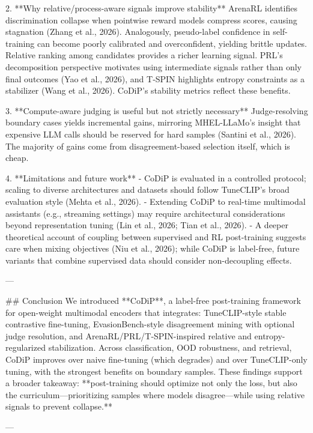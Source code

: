 2. **Why relative/process-aware signals improve stability**  
ArenaRL identifies discrimination collapse when pointwise reward models compress scores, causing stagnation (Zhang et al., 2026). Analogously, pseudo-label confidence in self-training can become poorly calibrated and overconfident, yielding brittle updates. Relative ranking among candidates provides a richer learning signal. PRL’s decomposition perspective motivates using intermediate signals rather than only final outcomes (Yao et al., 2026), and T‑SPIN highlights entropy constraints as a stabilizer (Wang et al., 2026). CoDiP’s stability metrics reflect these benefits.

3. **Compute-aware judging is useful but not strictly necessary**  
Judge-resolving boundary cases yields incremental gains, mirroring MHEL-LLaMo’s insight that expensive LLM calls should be reserved for hard samples (Santini et al., 2026). The majority of gains come from disagreement-based selection itself, which is cheap.

4. **Limitations and future work**  
- CoDiP is evaluated in a controlled protocol; scaling to diverse architectures and datasets should follow TuneCLIP’s broad evaluation style (Mehta et al., 2026).  
- Extending CoDiP to real-time multimodal assistants (e.g., streaming settings) may require architectural considerations beyond representation tuning (Lin et al., 2026; Tian et al., 2026).  
- A deeper theoretical account of coupling between supervised and RL post-training suggests care when mixing objectives (Niu et al., 2026); while CoDiP is label-free, future variants that combine supervised data should consider non-decoupling effects.

---

## Conclusion  
We introduced **CoDiP**, a label-free post-training framework for open-weight multimodal encoders that integrates: TuneCLIP-style stable contrastive fine-tuning, EvasionBench-style disagreement mining with optional judge resolution, and ArenaRL/PRL/T‑SPIN-inspired relative and entropy-regularized stabilization. Across classification, OOD robustness, and retrieval, CoDiP improves over naive fine-tuning (which degrades) and over TuneCLIP-only tuning, with the strongest benefits on boundary samples. These findings support a broader takeaway: **post-training should optimize not only the loss, but also the curriculum—prioritizing samples where models disagree—while using relative signals to prevent collapse.**

---

